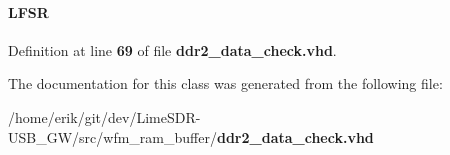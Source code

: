 \paragraph[{lfsr\+\_\+inst}]{ {\bfseries \textcolor{vhdlchar}{L\+F\+SR}\textcolor{vhdlchar}{ }} \hspace{0.3cm}{\ttfamily [Instantiation]}}\label{classddr2__data__check_1_1arch_addb1e66c9a2705b1827e0922e80ffea7}


Definition at line {\bf 69} of file {\bf ddr2\+\_\+data\+\_\+check.\+vhd}.



The documentation for this class was generated from the following file\+:\begin{DoxyCompactItemize}
\item 
/home/erik/git/dev/\+Lime\+S\+D\+R-\/\+U\+S\+B\+\_\+\+G\+W/src/wfm\+\_\+ram\+\_\+buffer/{\bf ddr2\+\_\+data\+\_\+check.\+vhd}\end{DoxyCompactItemize}
